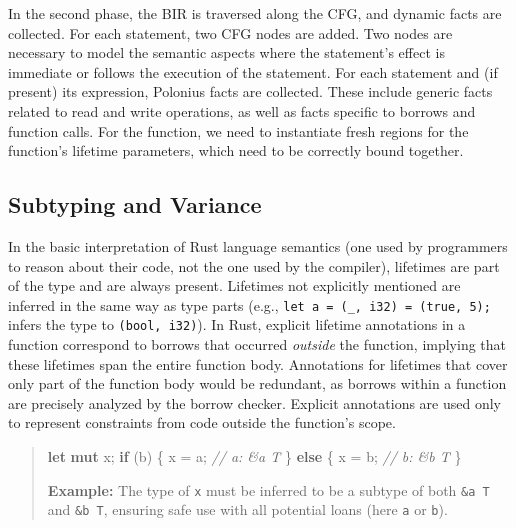 \documentclass[
  11pt,
  twoside,symmetric]{report}
\newenvironment{Shaded}{}{}
\newcommand{\CommentTok}[1]{\textit{#1}}
\newcommand{\ControlFlowTok}[1]{\textbf{#1}}
\newcommand{\KeywordTok}[1]{\textbf{#1}}
\newcommand{\NormalTok}[1]{#1}
\newcommand{\OperatorTok}[1]{#1}
\begin{document}
In the second phase, the BIR is traversed along the CFG, and dynamic
facts are collected. For each statement, two CFG nodes are added. Two
nodes are necessary to model the semantic aspects where the statement's
effect is immediate or follows the execution of the statement. For each
statement and (if present) its expression, Polonius facts are collected.
These include generic facts related to read and write operations, as
well as facts specific to borrows and function calls. For the function,
we need to instantiate fresh regions for the function's lifetime
parameters, which need to be correctly bound together.

\subsection{Subtyping and Variance}\label{sec:subtyping-and-variance}

In the basic interpretation of Rust language semantics (one used by
programmers to reason about their code, not the one used by the
compiler), lifetimes are part of the type and are always present.
Lifetimes not explicitly mentioned are inferred in the same way as type
parts (e.g., \texttt{let\ a\ =\ (\_,\ i32)\ =\ (true,\ 5);} infers the
type to \texttt{(bool,\ i32)}). In Rust, explicit lifetime annotations
in a function correspond to borrows that occurred \emph{outside} the
function, implying that these lifetimes span the entire function body.
Annotations for lifetimes that cover only part of the function body
would be redundant, as borrows within a function are precisely analyzed
by the borrow checker. Explicit annotations are used only to represent
constraints from code outside the function's scope.

\begin{quote}
\begin{Shaded}
\begin{Highlighting}[]
 \KeywordTok{let} \KeywordTok{mut}\NormalTok{ x}\OperatorTok{;}
 \ControlFlowTok{if}\NormalTok{ (b) }\OperatorTok{\{}
\NormalTok{     x }\OperatorTok{=}\NormalTok{ a}\OperatorTok{;} \CommentTok{// a: \&\textquotesingle{}a T}
 \OperatorTok{\}} \ControlFlowTok{else} \OperatorTok{\{}
\NormalTok{     x }\OperatorTok{=}\NormalTok{ b}\OperatorTok{;} \CommentTok{// b: \&\textquotesingle{}b T}
 \OperatorTok{\}}
\end{Highlighting}
\end{Shaded}

\textbf{Example:} The type of \texttt{x} must be inferred to be a
subtype of both \texttt{\&\textquotesingle{}a\ T} and
\texttt{\&\textquotesingle{}b\ T}, ensuring safe use with all potential
loans (here \texttt{a} or \texttt{b}).
\end{quote}
\end{document}
